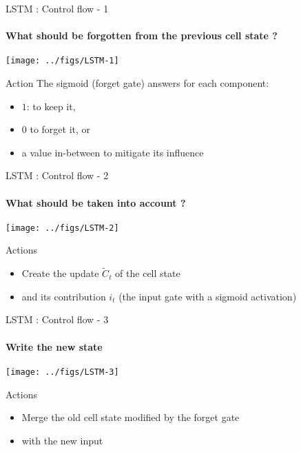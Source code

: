 \begin{frame}{LSTM : Control flow - 1}
  \framesubtitle{What should be forgotten from the previous cell  state ? }
  \begin{center}
    \texttt{[image: ../figs/LSTM-1]}
  \end{center}
      \begin{block}{Action}
        The sigmoid (forget gate) answers for each component:
        \begin{itemize}
        \item $1$: to keep it,
        \item $0$ to forget it, or
        \item a value in-between to mitigate its influence
        \end{itemize}
      \end{block}
\end{frame}

\begin{frame}{LSTM : Control flow - 2}
  \framesubtitle{What should be taken into account ? }
  \begin{center}
    \texttt{[image: ../figs/LSTM-2]}
  \end{center}
      \begin{block}{Actions}
        \begin{itemize}
        \item Create the update $\tilde{C}_t$ of the cell state
        \item and its contribution $i_t$ (the input gate with a sigmoid activation)
        \end{itemize}
      \end{block}
\end{frame}

\begin{frame}{LSTM : Control flow - 3}
  \framesubtitle{Write the new state}
  \begin{center}
    \texttt{[image: ../figs/LSTM-3]}
  \end{center}
      \begin{block}{Actions}
        \begin{itemize}
        \item Merge the old cell state modified by the forget gate
        \item with the new input 
        \end{itemize}
      \end{block}
\end{frame}


